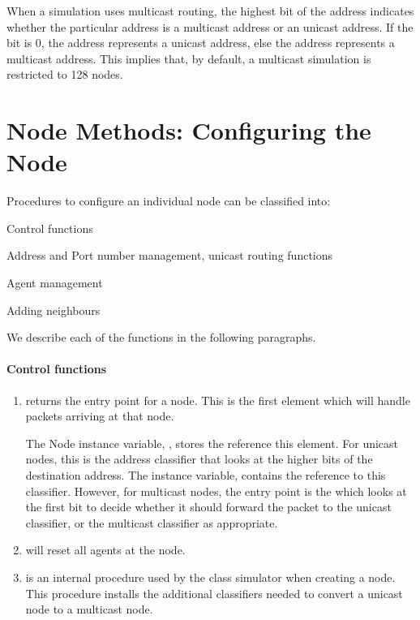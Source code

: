 {When a simulation uses multicast routing,
the highest bit of the address indicates whether the particular
address is a multicast address or an unicast address.
If the bit is 0, the address represents a unicast address,
else the address represents a multicast address.
This implies that, by default, 
a multicast simulation is restricted to 128 nodes.

\section{Node Methods: Configuring the Node}
\label{sec:node:node}

Procedures to configure an individual node can be classified into:
\begin{list}{---}{\itemsep0pt}
\item Control functions
\item Address and Port number management, unicast routing functions
\item Agent management
\item Adding neighbours
\end{list}
We describe each of the functions in the following paragraphs.

\paragraph{Control functions}
\begin{enumerate}
\item {} returns the entry point for a node.
This is the first element which will handle packets arriving at that node.

The Node instance variable, , stores the reference this element.
For unicast nodes, this is the address classifier that looks at the higher
bits of the destination address.
The instance variable,  contains the reference to this
classifier.
However, for multicast nodes, the entry point is the
 which looks at the first bit to decide whether
it should forward the packet to the unicast classifier, or the multicast
classifier as appropriate.

\item {} will reset all agents at the node.

\item {} is an internal procedure used
  by the class simulator when creating a node.
  This procedure installs the additional classifiers needed
  to convert a unicast node to a multicast node.
\end{enumerate}


}
